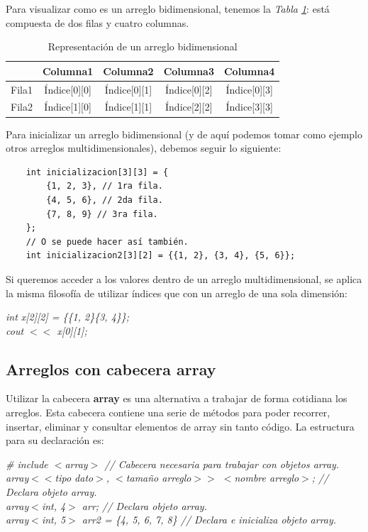 Para visualizar como es un arreglo bidimensional, tenemos la \textit{Tabla \ref{tab: 8}}: está compuesta de dos filas y cuatro columnas.
\begin{table}[H]
    \begin{center}
        \caption{Representación de un arreglo bidimensional}
        \label{tab: 8}
        \begin{tabular}{|c|c|c|c|c|}
            \hline
            &\textbf{Columna1} & \textbf{Columna2} & \textbf{Columna3} & \textbf{Columna4} \\ \hline
            Fila1 & Índice[0][0] & Índice[0][1] & Índice[0][2]	& Índice[0][3] \\ \hline
            Fila2 & Índice[1][0] & Índice[1][1] & Índice[2][2]  & Índice[3][3] \\
            \hline
        \end{tabular}
    \end{center}
\end{table}

Para inicializar un arreglo bidimensional (y de aquí podemos tomar como ejemplo otros arreglos multidimensionales), debemos seguir lo siguiente:
\begin{lstlisting}
    int inicializacion[3][3] = {
        {1, 2, 3}, // 1ra fila.
        {4, 5, 6}, // 2da fila.
        {7, 8, 9} // 3ra fila.
    };
    // O se puede hacer así también.
    int inicializacion2[3][2] = {{1, 2}, {3, 4}, {5, 6}};
\end{lstlisting}

Si queremos acceder a los valores dentro de un arreglo multidimensional, se aplica la misma filosofía de utilizar índices que con un arreglo de una sola dimensión:
\begin{center}
	\textit{
		int x[2][2] = \{\{1, 2\}\{3, 4\}\}; \\
		cout $<<$ x[0][1];
	}
\end{center}


\subsection{Arreglos con cabecera array}
\hspace{0.55cm}Utilizar la cabecera \textbf{array} es una alternativa a trabajar de forma cotidiana los arreglos. Esta cabecera contiene una serie de métodos para poder recorrer, insertar, eliminar y consultar elementos de array sin tanto código. La estructura para su declaración es:
\begin{center}
	\textit{
		\# include $<$array$>$ // Cabecera necesaria para trabajar con objetos array. \\
		array$<<$tipo dato$>$, $<$tamaño arreglo$>>$ $<$nombre arreglo$>$; // Declara objeto array. \\
		array$<$int, 4$>$ arr; // Declara objeto array. \\
		array$<$int, 5$>$ arr2 = \{4, 5, 6, 7, 8\} // Declara e inicializa objeto array.
	}
\end{center}

